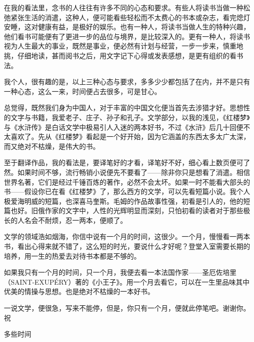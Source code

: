 
\par {}
\par 在我的看法里，念书的人往往有许多不同的心态和要求。有些人将读书当做一种松弛紧张生活的消遣，这种人，便可能看些轻松而不太费心的书本或杂志，看完熄灯安睡，这对健康有益，是极好的娱乐。也有一种人，将读书当做人生的特种兴趣，他们看书可能便有了更进一步的品位与境界，是比较深入的。更有一种人，将读书视为人生最大的事业，既然是事业，便必然有计划与经营，一步一步来，慎重地挑，仔细地读，甚而阅书之后，用文字记下心得或发表感想，是更有组织的看书法。
\par 我个人，很有趣的是，以上三种心态与要求，多多少少都包括了在内，并不是只有一种心态，这么一来，时间便占去很多，可是甘心。
\par 总觉得，既然我们身为中国人，对于丰富的中国文化便当首先去涉猎才好。思想性的文字与书籍，我爱老子、庄子、孙子和孔子。文学部分，以我的浅见，《红楼梦》与《水浒传》是白话文学中极易引人入迷的两本好书，不过《水浒》后几十回便不太喜欢了。先从《红楼梦》看起是一个好开始，因为它涵盖的东西太多太广太深，而又绝对不枯燥，是伟大的书。
\par 至于翻译作品，我的看法是，要译笔好的才看，译笔好不好，细心看上数页便可了然。如果时间不够，流行畅销小说便先不要看了——除非你只是想看了消遣。相信世界名著，它们是经过千锤百炼的著作，必然不会太坏。如果一时不能看大部头的书——假设你已在看《红楼梦》了，那么西方的文学，可以先看短篇小说。我个人极爱海明威的短篇，也深喜马奎斯。毛姆的作品故事性强，初看是引人的，他的短篇也好。旧俄作家的文字中，人性的光辉明显而深刻，只怕初看的读者对于那些极长的人名会不耐烦，忍一两本，便顺了。
\par 文学的领域浩如烟海，你信中说有一个月的时间，这很少。一个月，慢慢看一两本书，看出心得来就不错了，这么短的时光，要说什么才好呢？登堂入室需要长期的培养，用一生的热爱去对待书本都是不够的。
\par 如果我只有一个月的时间，只一个月，我便去看一本法国作家——圣厄佐培里（SAINT-EXUPÉRY）著的《小王子》。用一个月去看它，可以在一生里品味其中优美的情操与思想。也是绝对不枯燥的一本好书。
\par 一说文学，便很急，写来不能停，但是，你只有一个月，便就此停笔吧。谢谢你。祝
\par 多些时间
\par {}



